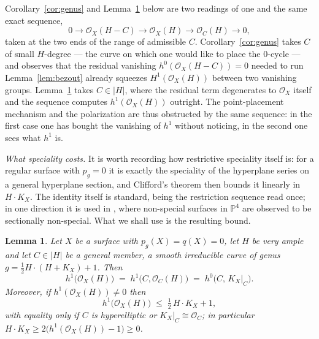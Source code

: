\documentclass{amsart}
\newtheorem{lemma}[theorem]{Lemma}
\theoremstyle{definition}
\newcommand{\OO}{\mathcal{O}}
\newcommand{\PP}{\mathbb{P}}
\begin{document}
\medskip
Corollary~\ref{cor:genus} and Lemma~\ref{lem:restriction} below are two readings of one and the same exact sequence,
\[
0\longrightarrow\OO_X(H-C)\longrightarrow\OO_X(H)\longrightarrow\OO_C(H)\longrightarrow 0 ,
\]
taken at the two ends of the range of admissible $C$. Corollary~\ref{cor:genus} takes $C$ of small $H$-degree --- the curve on which one would like to place the $0$-cycle --- and observes that the residual vanishing $h^0(\OO_X(H-C))=0$ needed to run Lemma~\ref{lem:bezout} already squeezes $H^1(\OO_X(H))$ between two vanishing groups. Lemma~\ref{lem:restriction} takes $C\in|H|$, where the residual term degenerates to $\OO_X$ itself and the sequence computes $h^1(\OO_X(H))$ outright. The point-placement mechanism and the polarization are thus obstructed by the same sequence: in the first case one has bought the vanishing of $h^1$ without noticing, in the second one sees what $h^1$ is.

\medskip
\noindent\emph{What speciality costs.} It is worth recording how restrictive speciality itself is: for a regular surface with $p_g=0$ it is exactly the speciality of the hyperplane series on a general hyperplane section, and Clifford's theorem then bounds it linearly in $H\cdot K_X$. The identity itself is standard, being the restriction sequence read once; in one direction it is used in \cite[Lem.~3.1 and Ex.~5.4]{Cas17}, where non-special surfaces in $\PP^4$ are observed to be sectionally non-special. What we shall use is the resulting bound.

\begin{lemma}\label{lem:restriction}
Let $X$ be a surface with $p_g(X)=q(X)=0$, let $H$ be very ample and let $C\in|H|$ be a general member, a smooth irreducible curve of genus $g=\tfrac12H\cdot(H+K_X)+1$. Then
\[
h^1\bigl(\OO_X(H)\bigr)\;=\;h^1\bigl(C,\OO_C(H)\bigr)\;=\;h^0\bigl(C,\,K_X|_C\bigr).
\]
Moreover, if $h^1(\OO_X(H))\neq0$ then
\[
h^1\bigl(\OO_X(H)\bigr)\;\le\;\tfrac12\,H\cdot K_X+1 ,
\]
with equality only if $C$ is hyperelliptic or $K_X|_C\cong\OO_C$; in particular $H\cdot K_X\ge2\bigl(h^1(\OO_X(H))-1\bigr)\ge0$.
\end{lemma}
\end{document}
